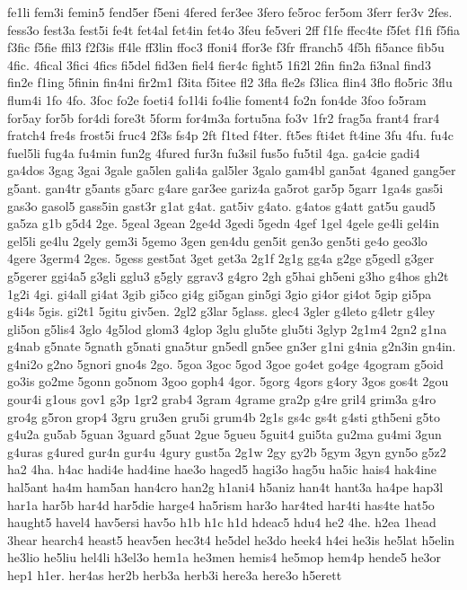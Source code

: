 {fe1li
fem3i
femin5
fend5er
f5eni
4fered
fer3ee
3fero
fe5roc
fer5om
3ferr
fer3v
2fes.
fess3o
fest3a
fest5i
fe4t
fet4al
fet4in
fet4o
3feu
fe5veri
2ff
f1fe
ffec4te
f5fet
f1fi
f5fia
f3fic
f5fie
ffil3
f2f3is
ff4le
ff3lin
ffoc3
ffoni4
ffor3e
f3fr
ffranch5
4f5h
fi5ance
fib5u
4fic.
4fical
3fici
4fics
fi5del
fid3en
fiel4
fier4c
fight5
1fi2l
2fin
fin2a
fi3nal
find3
fin2e
f1ing
5finin
fin4ni
fir2m1
f3ita
f5itee
fl2
3fla
fle2s
f3lica
flin4
3flo
flo5ric
3flu
flum4i
1fo
4fo.
3foc
fo2e
foeti4
fo1l4i
fo4lie
foment4
fo2n
fon4de
3foo
fo5ram
for5ay
for5b
for4di
fore3t
5form
for4m3a
fortu5na
fo3v
1fr2
frag5a
frant4
frar4
fratch4
fre4s
frost5i
fruc4
2f3s
fs4p
2ft
f1ted
f4ter.
ft5es
fti4et
ft4ine
3fu
4fu.
fu4c
fuel5li
fug4a
fu4min
fun2g
4fured
fur3n
fu3sil
fus5o
fu5til
4ga.
ga4cie
gadi4
ga4dos
3gag
3gai
3gale
ga5len
gali4a
gal5ler
3galo
gam4bl
gan5at
4ganed
gang5er
g5ant.
gan4tr
g5ants
g5arc
g4are
gar3ee
gariz4a
ga5rot
gar5p
5garr
1ga4s
gas5i
gas3o
gasol5
gass5in
gast3r
g1at
g4at.
gat5iv
g4ato.
g4atos
g4att
gat5u
gaud5
ga5za
g1b
g5d4
2ge.
5geal
3gean
2ge4d
3gedi
5gedn
4gef
1gel
4gele
ge4li
gel4in
gel5li
ge4lu
2gely
gem3i
5gemo
3gen
gen4du
gen5it
gen3o
gen5ti
ge4o
geo3lo
4gere
3germ4
2ges.
5gess
gest5at
3get
get3a
2g1f
2g1g
gg4a
g2ge
g5gedl
g3ger
g5gerer
ggi4a5
g3gli
gglu3
g5gly
ggrav3
g4gro
2gh
g5hai
gh5eni
g3ho
g4hos
gh2t
1g2i
4gi.
gi4all
gi4at
3gib
gi5co
gi4g
gi5gan
gin5gi
3gio
gi4or
gi4ot
5gip
gi5pa
g4i4s
5gis.
gi2t1
5gitu
giv5en.
2gl2
g3lar
5glass.
glec4
3gler
g4leto
g4letr
g4ley
gli5on
g5lis4
3glo
4g5lod
glom3
4glop
3glu
glu5te
glu5ti
3glyp
2g1m4
2gn2
g1na
g4nab
g5nate
5gnath
g5nati
gna5tur
gn5edl
gn5ee
gn3er
g1ni
g4nia
g2n3in
gn4in.
g4ni2o
g2no
5gnori
gno4s
2go.
5goa
3goc
5god
3goe
go4et
go4ge
4gogram
g5oid
go3is
go2me
5gonn
go5nom
3goo
goph4
4gor.
5gorg
4gors
g4ory
3gos
gos4t
2gou
gour4i
g1ous
gov1
g3p
1gr2
grab4
3gram
4grame
gra2p
g4re
gril4
grim3a
g4ro
gro4g
g5ron
grop4
3gru
gru3en
gru5i
grum4b
2g1s
gs4c
gs4t
g4sti
gth5eni
g5to
g4u2a
gu5ab
5guan
3guard
g5uat
2gue
5gueu
5guit4
gui5ta
gu2ma
gu4mi
3gun
g4uras
g4ured
gur4n
gur4u
4gury
gust5a
2g1w
2gy
gy2b
5gym
3gyn
gyn5o
g5z2
ha2
4ha.
h4ac
hadi4e
had4ine
hae3o
haged5
hagi3o
hag5u
ha5ic
hais4
hak4ine
hal5ant
ha4m
ham5an
han4cro
han2g
h1ani4
h5aniz
han4t
hant3a
ha4pe
hap3l
har1a
har5b
har4d
har5die
harge4
ha5rism
har3o
har4ted
har4ti
has4te
hat5o
haught5
havel4
hav5ersi
hav5o
h1b
h1c
h1d
hdeac5
hdu4
he2
4he.
h2ea
1head
3hear
hearch4
heast5
heav5en
hec3t4
he5del
he3do
heek4
h4ei
he3is
he5lat
h5elin
he3lio
he5liu
hel4li
h3el3o
hem1a
he3men
hemis4
he5mop
hem4p
hende5
he3or
hep1
h1er.
her4as
her2b
herb3a
herb3i
here3a
here3o
h5erett
}

